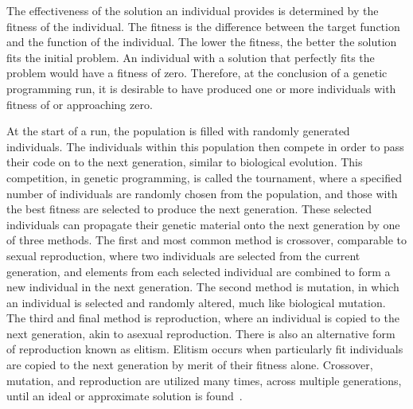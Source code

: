 \documentclass[12pt]{article}
\begin{document}
The effectiveness of the solution an individual provides is determined by the fitness of the individual. The fitness is the difference between the target function and the function of the individual. The lower the fitness, the better the solution fits the initial problem. An individual with a solution that perfectly fits the problem would have a fitness of zero. Therefore, at the conclusion of a genetic programming run, it is desirable to have produced one or more individuals with fitness of or approaching zero.

At the start of a run, the population is filled with randomly generated individuals. The individuals within this population then compete in order to pass their code on to the next generation, similar to biological evolution. This competition, in genetic programming, is called the tournament, where a specified number of individuals are randomly chosen from the population, and those with the best fitness are selected to produce the next generation. These selected individuals can propagate their genetic material onto the next generation by one of three methods. The first and most common method is crossover, comparable to sexual reproduction, where two individuals are selected from the current generation, and elements from each selected individual are combined to form a new individual in the next generation. The second method is mutation, in which an individual is selected and randomly altered, much like biological mutation. The third and final method is reproduction, where an individual is copied to the next generation, akin to asexual reproduction. There is also an alternative form of reproduction known as elitism. Elitism occurs when particularly fit individuals are copied to the next generation by merit of their fitness alone. Crossover, mutation, and reproduction are utilized many times, across multiple generations, until an ideal or approximate solution is found~\cite{poli08:fieldguide}.





\end{document}
